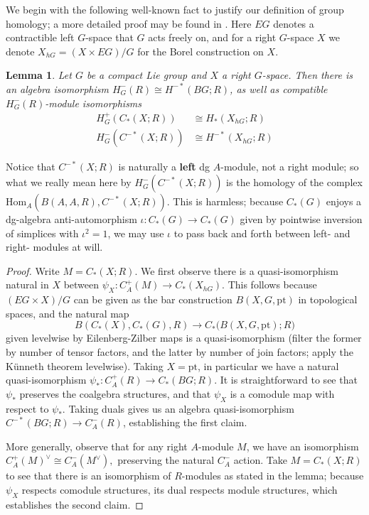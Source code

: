 \documentclass{memo-l}
\newtheorem{lemma}[theorem]{Lemma}
\theoremstyle{definition}
\theoremstyle{remark}
\numberwithin{section}{chapter}
\numberwithin{equation}{chapter}
\begin{document}
We begin with the following well-known fact to justify our definition of group homology; a more detailed proof may be found in \cite[Theorem~3.9]{GM}. Here $EG$ denotes a contractible left $G$-space that $G$ acts freely on, and for a right $G$-space $X$ we denote $X_{hG} = (X \times EG)/G$ for the Borel construction on $X$.

\begin{lemma}\label{groupcoho}
Let $G$ be a compact Lie group and $X$ a right $G$-space. Then there is an algebra isomorphism $H^-_G(R) \cong H^{-*}(BG; R)$, as well as compatible $H^-_G(R)$-module isomorphisms \begin{align*}
H_G^+(C_*(X;R)) &\cong H_*(X_{hG}; R) \\
H_G^-(C^{-*}(X; R)) &\cong H^{-*}(X_{hG}; R) 
\end{align*}
\end{lemma}

Notice that $C^{-*}(X;R)$ is naturally a \textbf{left} dg $A$-module, not a right module; so what we really mean here by $H_G^-(C^{-*}(X; R))$ is the homology of the complex $\text{Hom}_A(B(A,A,R), C^{-*}(X; R))$. This is harmless; because $C_*(G)$ enjoys a dg-algebra anti-automorphism $\iota: C_*(G) \to C_*(G)$ given by pointwise inversion of simplices with $\iota^2 = 1$, we may use $\iota$ to pass back and forth between left- and right- modules at will. 

\begin{proof}
Write $M = C_*(X; R)$. We first observe there is a quasi-isomorphism natural in $X$ between $\psi_X: C_A^+(M) \to C_*(X_{hG})$. This follows because $(EG \times X)/G$ can be given as the bar construction $B(X,G,\text{pt})$ in topological spaces, and the natural map $$B(C_*(X),C_*(G),R) \to C_*\big(B(X,G,\text{pt});R\big)$$ given levelwise by Eilenberg-Zilber maps is a quasi-isomorphism (filter the former by number of tensor factors, and the latter by number of join factors; apply the K\"unneth theorem levelwise). Taking $X = \text{pt}$, in particular we have a natural quasi-isomorphism $\psi_\ast: C_A^+(R) \to C_*(BG;R)$. It is straightforward to see that $\psi_\ast$ preserves the coalgebra structures, and that $\psi_X$ is a comodule map with respect to $\psi_\ast$. Taking duals gives us an algebra quasi-isomorphism $C^{-*}(BG;R) \to C^-_A(R)$, establishing the first claim. 

More generally, observe that for any right $A$-module $M$, we have an isomorphism $C_A^+(M)^\vee \cong C_A^-(M^\vee),$ preserving the natural $C_A^-$ action. Take $M = C_*(X;R)$ to see that there is an isomorphism of $R$-modules as stated in the lemma; because $\psi_X$ respects comodule structures, its dual respects module structures, which establishes the second claim.
\end{proof}
\end{document}
